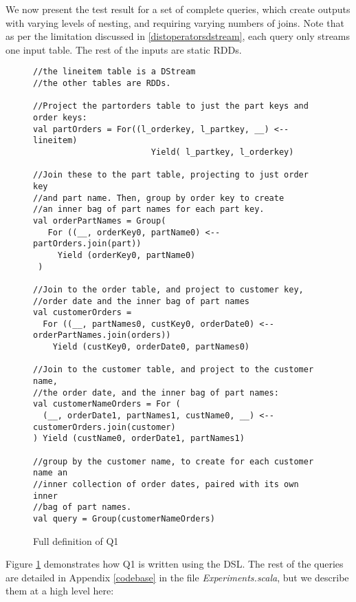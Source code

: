 We now present the test result for a set of complete queries, which create outputs with varying levels of nesting, and requiring varying numbers of joins. Note that as per the limitation discussed in \ref{distoperatorsdstream}, each query only streams one input table. The rest of the inputs are static RDDs.
\begin{figure}
\begin{lstlisting}
//the lineitem table is a DStream
//the other tables are RDDs.

//Project the partorders table to just the part keys and order keys:
val partOrders = For((l_orderkey, l_partkey, __) <-- lineitem)
                        Yield( l_partkey, l_orderkey)

//Join these to the part table, projecting to just order key
//and part name. Then, group by order key to create 
//an inner bag of part names for each part key.
val orderPartNames = Group(
   For ((__, orderKey0, partName0) <-- partOrders.join(part))
     Yield (orderKey0, partName0)
 )

//Join to the order table, and project to customer key, 
//order date and the inner bag of part names
val customerOrders =
  For ((__, partNames0, custKey0, orderDate0) <-- orderPartNames.join(orders))
    Yield (custKey0, orderDate0, partNames0)

//Join to the customer table, and project to the customer name,
//the order date, and the inner bag of part names:
val customerNameOrders = For (
  (__, orderDate1, partNames1, custName0, __) <-- customerOrders.join(customer)
) Yield (custName0, orderDate1, partNames1)

//group by the customer name, to create for each customer name an 
//inner collection of order dates, paired with its own inner 
//bag of part names.
val query = Group(customerNameOrders)
\end{lstlisting}
\caption{Full definition of Q1}
\label{q1-def}
\end{figure}

Figure \ref{q1-def} demonstrates how Q1 is written using the DSL. The rest of the queries are detailed in Appendix \ref{codebase} in the file \textit{Experiments.scala}, but we describe them at a high level here:

